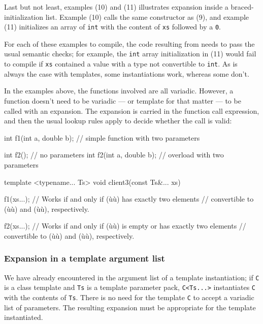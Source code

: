 Last but not least, examples (10) and (11) illustrates expansion inside
a braced-initialization list. Example (10) calls the same constructor as
(9), and example (11) initializes an array of \lstinline!int! with the
content of \lstinline!xs! followed by a \lstinline!0!.

For each of these examples to compile, the code resulting from
 needs to pass the usual semantic checks; for
example, the \lstinline!int! array initialization in (11) would fail to
compile if \lstinline!xs! contained a value with a type not convertible to
\lstinline!int!. As is always the case with templates, some instantiations
work, whereas some don't.

In the examples above, the functions involved are all variadic. However,
a function doesn't need to be variadic --- or template for that matter
--- to be called with an expansion. The expansion is carried in the
function call expression, and then the usual lookup rules apply to
decide whether the call is valid:

\begin{emcppslisting}
int f1(int a, double b);  // simple function with two parameters

int f2();                 // no parameters
int f2(int a, double b);  // overload with two parameters

template <typename... Ts>
void client3(const Ts&... xs)
{
    f1(xs...);  // Works if and only if (ù{}ù) has exactly two elements
                // convertible to (ù{}ù) and (ù{}ù), respectively.

    f2(xs...);  // Works if and only if (ù{}ù) is empty or has exactly two elements
                // convertible to (ù{}ù) and (ù{}ù), respectively.
}
\end{emcppslisting}
    

\subsubsection[Expansion in a template argument list]{Expansion in a template argument list}\label{expansion-in-a-template-argument-list}

We have already encountered  in the argument list
of a template instantiation; if \lstinline!C! is a class template and
\lstinline!Ts! is a template parameter pack, \lstinline!C<Ts...>! instantiates
\lstinline!C! with the contents of \lstinline!Ts!. There is no need for the
template \lstinline!C! to accept a variadic list of parameters. The
resulting expansion must be appropriate for the template instantiated.


